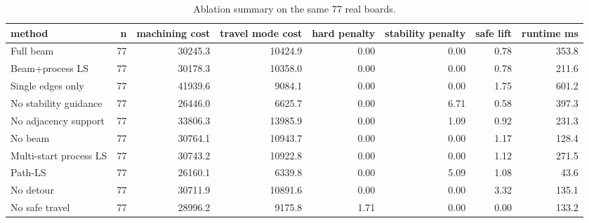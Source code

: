 \begin{table}[t]
\centering
\caption{Ablation summary on the same 77 real boards.}
\label{tab:ablation-method-summary}
\begin{tabular}{lrrrrrrr}
\toprule
method & n & machining cost & travel mode cost & hard penalty & stability penalty & safe lift & runtime ms \\
\midrule
Full beam & 77 & 30245.3 & 10424.9 & 0.00 & 0.00 & 0.78 & 353.8 \\
Beam+process LS & 77 & 30178.3 & 10358.0 & 0.00 & 0.00 & 0.78 & 211.6 \\
Single edges only & 77 & 41939.6 & 9084.1 & 0.00 & 0.00 & 1.75 & 601.2 \\
No stability guidance & 77 & 26446.0 & 6625.7 & 0.00 & 6.71 & 0.58 & 397.3 \\
No adjacency support & 77 & 33806.3 & 13985.9 & 0.00 & 1.09 & 0.92 & 231.3 \\
No beam & 77 & 30764.1 & 10943.7 & 0.00 & 0.00 & 1.17 & 128.4 \\
Multi-start process LS & 77 & 30743.2 & 10922.8 & 0.00 & 0.00 & 1.12 & 271.5 \\
Path-LS & 77 & 26160.1 & 6339.8 & 0.00 & 5.09 & 1.08 & 43.6 \\
No detour & 77 & 30711.9 & 10891.6 & 0.00 & 0.00 & 3.32 & 135.1 \\
No safe travel & 77 & 28996.2 & 9175.8 & 1.71 & 0.00 & 0.00 & 133.2 \\
\bottomrule
\end{tabular}
\end{table}
